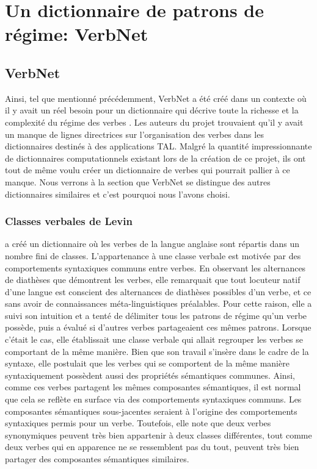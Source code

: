 
\chapter{Un dictionnaire de patrons de régime: VerbNet}

\section{VerbNet}

Ainsi, tel que mentionné précédemment, VerbNet a été créé dans un contexte où il y avait un réel besoin pour un dictionnaire qui décrive toute la richesse et la complexité du régime des verbes \citep{KipperClassBasedConstructionVerb2000}. Les auteurs du projet trouvaient qu'il y avait un manque de lignes directrices sur l'organisation des verbes dans les dictionnaires destinés à des applications TAL. Malgré la quantité impressionnante de dictionnaires computationnels existant lors de la création de ce projet, ils ont tout de même voulu créer un dictionnaire de verbes qui pourrait pallier à ce manque. Nous verrons à la section  que VerbNet se distingue des autres dictionnaires similaires et c'est pourquoi nous l'avons choisi.

\subsection{Classes verbales de Levin}

\cite{verb-classes.levin.1993} a créé un dictionnaire où les verbes de la langue anglaise sont répartis dans un nombre fini de classes. L'appartenance à une classe verbale est motivée par des comportements syntaxiques communs entre verbes. En observant les alternances de diathèses que démontrent les verbes, elle remarquait que tout locuteur natif d'une langue est conscient des alternances de diathèses possibles d'un verbe, et ce sans avoir de connaissances méta-linguistiques préalables. Pour cette raison, elle a suivi son intuition et a tenté de délimiter tous les patrons de régime qu'un verbe possède, puis a évalué si d'autres verbes partageaient ces mêmes patrons. Lorsque c'était le cas, elle établissait une classe verbale qui allait regrouper les verbes se comportant de la même manière. Bien que son travail s'insère dans le cadre de la syntaxe, elle postulait que les verbes qui se comportent de la même manière syntaxiquement possèdent aussi des propriétés sémantiques communes. Ainsi, comme ces verbes partagent les mêmes composantes sémantiques, il est normal que cela se reflète en surface via des comportements syntaxiques communs. Les composantes sémantiques sous-jacentes seraient à l'origine des comportements syntaxiques permis pour un verbe. Toutefois, elle note que deux verbes synonymiques peuvent très bien appartenir à deux classes différentes, tout comme deux verbes qui en apparence ne se ressemblent pas du tout, peuvent très bien partager des composantes sémantiques similaires.

